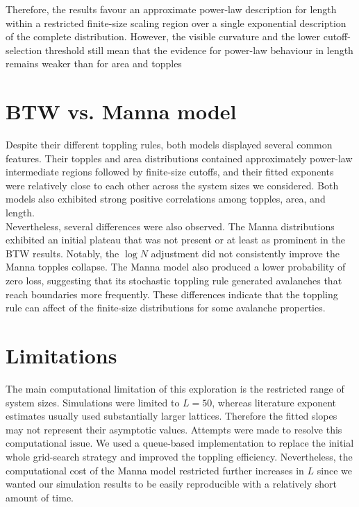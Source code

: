 Therefore, the results favour an approximate power-law description for length within a restricted finite-size scaling region over a single exponential description of the complete distribution. However, the visible curvature and the lower cutoff-selection threshold still mean that the evidence for power-law behaviour in length remains weaker than for area and topples

\section{BTW vs. Manna model}\label{sec:discuss-models}

Despite their different toppling rules, both models displayed several common features. Their topples and area distributions contained approximately power-law intermediate regions followed by finite-size cutoffs, and their fitted exponents were relatively close to each other across the system sizes we considered. Both models also exhibited strong positive correlations among topples, area, and length. \\

Nevertheless, several differences were also observed. The Manna distributions exhibited an initial plateau that was not present or at least as prominent in the BTW results. Notably, the $\log N$ adjustment did not consistently improve the Manna topples collapse. The Manna model also produced a lower probability of zero loss, suggesting that its stochastic toppling rule generated avalanches that reach boundaries more frequently. These differences indicate that the toppling rule can affect of the finite-size distributions for some avalanche properties.

\section{Limitations}\label{sec:limitations}

The main computational limitation of this exploration is the restricted range of system sizes. Simulations were limited to $L=50$, whereas  literature exponent estimates usually used substantially larger lattices. Therefore the fitted slopes may not represent their asymptotic values. Attempts were made to resolve this computational issue. We used a queue-based implementation to replace the initial whole grid-search strategy and improved the toppling efficiency. Nevertheless, the computational cost of the Manna model restricted further increases in $L$ since we wanted our simulation results to be easily reproducible with a relatively short amount of time.\\

